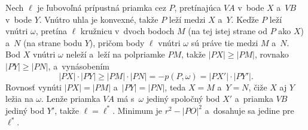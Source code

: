 {    Nech $\ell$ je ľubovoľná prípustná priamka cez $P$, pretínajúca $VA$ v~bode $X$ a~$VB$ v~bode $Y$. Vnútro uhla je konvexné, takže $P$ leží medzi $X$ a~$Y$. Keďže $P$ leží vnútri $\omega$, pretína $\ell$ kružnicu v~dvoch bodoch $M$ (na tej istej strane od $P$ ako $X$) a~$N$ (na strane bodu $Y$), pričom body $\ell$ vnútri $\omega$ sú práve tie medzi $M$ a~$N$. Bod $X$ vnútri $\omega$ neleží a~leží na polpriamke $PM$, takže $|PX| \ge |PM|$, rovnako $|PY| \ge |PN|$, a~vynásobením
    $$
    |PX| \cdot |PY| \ge |PM| \cdot |PN| = -p(P,\omega) = |PX'| \cdot |PY'|.
    $$
    Rovnosť vynúti $|PX| = |PM|$ a~$|PY| = |PN|$, teda $X = M$ a~$Y = N$, čiže $X$ aj $Y$ ležia na $\omega$. Lenže priamka $VA$ má s~$\omega$ jediný spoločný bod $X'$ a~priamka $VB$ jediný bod $Y'$, takže $\ell = \ell^*$. Minimum je $r^2 - |PO|^2$ a~dosahuje sa jedine pre $\ell^*$.
}

